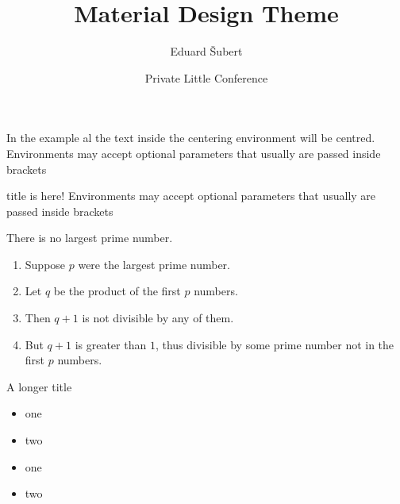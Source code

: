 \documentclass[aspectratio=43]{beamer}
\title{Material Design Theme}
\date[PLC]{Private Little Conference}
\author[Šubert]{Eduard Šubert}
\begin{document}
\begin{frame}
\titlepage
\end{frame}

\begin{frame}
\begin{multicols}{2}
  \begin{card}
  \centering
  In the example al the text inside the centering environment will be centred. 
  \tcblower
  Environments may {\color{accent}accept optional} parameters that usually are passed inside brackets
  \end{card}

  \begin{cardTitle}{title is here!}
  Environments may accept optional parameters that usually are passed inside brackets
  \end{cardTitle}
\end{multicols}
\end{frame}

\begin{frame} 
\begin{theorem}[tramtadada]
There is no largest prime number. 
\end{theorem} 
\begin{card}
\begin{enumerate} 
\item Suppose $p$ were the largest prime number. 
\item Let $q$ be the product of the first $p$ numbers. 
\item Then $q+1$ is not divisible by any of them. 
\item But $q + 1$ is greater than $1$, thus divisible by some prime
number not in the first $p$ numbers.
\end{enumerate}
\end{card}
\end{frame}

\begin{frame}{A longer title}
\begin{card}
\begin{itemize}
\item one
\item two
\end{itemize}
\begin{itemize}
\item one
\item two
\end{itemize}
\end{card}
\end{frame}
\end{document}
